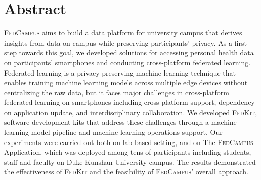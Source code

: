 \documentclass[11pt,a4paper,oneside]{report}
\newcommand{\instructions}[1]{{\color{orange}\itshape #1}}
\renewcommand{\instructions}[1]{} %
\newcommand{\fedcampus}{\textsc{FedCampus}\xspace}
\newcommand{\fedkit}{\textsc{FedKit}\xspace}
\begin{document}

\clearpage
{}


\setcounter{tocdepth}{0} %
\tableofcontents


\chapter*{Abstract}


\instructions{Abstract (English): 150 -- 200 words. An abstract is a brief
    statement of the problem or the purpose of the research. It should indicate
    the theoretical work or experimental plan used, summarize principal findings
    of the research, and point out major conclusions. Appropriate safety
    information should be included when applicable. This should be the section
    you write last to be sure that it accurately reflects the content of the
    document.}

\fedcampus aims to build a data platform for university campus that derives
insights from data on campus while preserving participants' privacy.
As a first step towards this goal,
we developed solutions for accessing personal health data on participants'
smartphones and conducting cross-platform federated learning.
Federated learning is a privacy-preserving machine learning technique that
enables training machine learning models across multiple edge devices without
centralizing the raw data,
but it faces major challenges in cross-platform federated learning on
smartphones including cross-platform support, dependency on application update,
and interdisciplinary collaboration. We developed \fedkit,
software development kits that address these challenges through a machine
learning model pipeline and machine learning operations support.
Our experiments were carried out both on lab-based setting,
and on The \fedcampus Application,
which was deployed among tens of participants including students,
staff and faculty on Duke Kunshan University campus.
The results demonstrated the effectiveness of \fedkit and the feasibility of
\fedcampus' overall approach.
\end{document}
